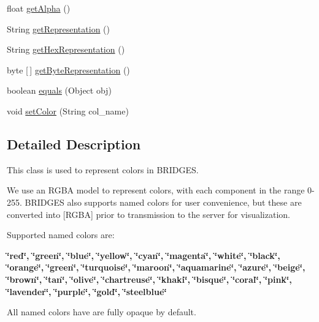 \begin{DoxyCompactItemize}
\item 
float \mbox{\hyperlink{classbridges_1_1base_1_1_color_a7c4247e31ecd8fcc61ef208d5deefe68}{get\+Alpha}} ()
\item 
String \mbox{\hyperlink{classbridges_1_1base_1_1_color_a2f9b0cb588e49b2ebf2f015d4d7507d0}{get\+Representation}} ()
\item 
String \mbox{\hyperlink{classbridges_1_1base_1_1_color_aced9bc89248b85686ba5385472974fe6}{get\+Hex\+Representation}} ()
\item 
byte \mbox{[}$\,$\mbox{]} \mbox{\hyperlink{classbridges_1_1base_1_1_color_a07215c888a6d17374a3d862ff30d5f93}{get\+Byte\+Representation}} ()
\item 
boolean \mbox{\hyperlink{classbridges_1_1base_1_1_color_a81fb4cb13c05a3da2f29f48b07189e7c}{equals}} (Object obj)
\item 
void \mbox{\hyperlink{classbridges_1_1base_1_1_color_a54dcd31227bde0f5d0a4f5d3b5a24ed2}{set\+Color}} (String col\+\_\+name)
\end{DoxyCompactItemize}


\subsection{Detailed Description}
This class is used to represent colors in B\+R\+I\+D\+G\+ES. 

We use an R\+G\+BA model to represent colors, with each component in the range 0-\/255. B\+R\+I\+D\+G\+ES also supports named colors for user convenience, but these are converted into \mbox{[}R\+G\+BA\mbox{]} prior to transmission to the server for visualization.

Supported named colors are\+:

{\bfseries{\char`\"{}red\char`\"{}, \char`\"{}green\char`\"{}, \char`\"{}blue\char`\"{}, \char`\"{}yellow\char`\"{}, \char`\"{}cyan\char`\"{}, \char`\"{}magenta\char`\"{}, \char`\"{}white\char`\"{}, \char`\"{}black\char`\"{}, \char`\"{}orange\char`\"{}, \char`\"{}green\char`\"{}, \char`\"{}turquoise\char`\"{}, \char`\"{}maroon\char`\"{}, \char`\"{}aquamarine\char`\"{}, \char`\"{}azure\char`\"{}, \char`\"{}beige\char`\"{}, \char`\"{}brown\char`\"{}, \char`\"{}tan\char`\"{}, \char`\"{}olive\char`\"{}, \char`\"{}chartreuse\char`\"{}, \char`\"{}khaki\char`\"{}, \char`\"{}bisque\char`\"{}, \char`\"{}coral\char`\"{}, \char`\"{}pink\char`\"{}, \char`\"{}lavender\char`\"{}, \char`\"{}purple\char`\"{}, \char`\"{}gold\char`\"{}, \char`\"{}steelblue\char`\"{}}}

All named colors have are fully opaque by default.


